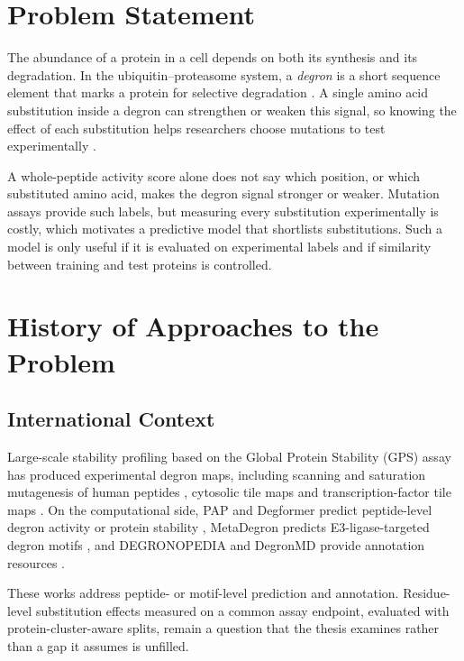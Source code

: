 \label{chap:introduction}
\ThesisFlatNumbering

\section{Problem Statement}
The abundance of a protein in a cell depends on both its synthesis and its degradation.
In the ubiquitin--proteasome system, a \emph{degron} is a short sequence element that marks a protein for
selective degradation \citep{varshavsky2019,koren2018}. A single amino acid substitution inside a degron can
strengthen or weaken this signal, so knowing the effect of each substitution helps researchers choose
mutations to test experimentally \citep{zhang2023,voutsinos2026}.

A whole-peptide activity score alone does not say which position, or which substituted amino acid,
makes the degron signal stronger or weaker. Mutation assays provide such labels, but measuring every
substitution experimentally is costly, which motivates a predictive model that shortlists substitutions.
Such a model is only useful if it is evaluated on experimental labels and if similarity between training
and test proteins is controlled.

\section{History of Approaches to the Problem}
\subsection{International Context}
Large-scale stability profiling based on the Global Protein Stability (GPS) assay \citep{yen2008} has produced
experimental degron maps, including scanning and saturation mutagenesis of human peptides
\citep{zhang2023}, cytosolic tile maps \citep{voutsinos2026} and transcription-factor tile maps
\citep{larsen2025}. On the
computational side, PAP and Degformer predict peptide-level degron activity or protein stability
\citep{voutsinos2026,degformer}, MetaDegron predicts E3-ligase-targeted degron motifs \citep{zheng2024},
and DEGRONOPEDIA and DegronMD provide annotation resources \citep{degronopedia,degronmd}.

These works address peptide- or motif-level prediction and annotation. Residue-level substitution
effects measured on a common assay endpoint, evaluated with protein-cluster-aware splits, remain
a question that the thesis examines rather than a gap it assumes is unfilled.

